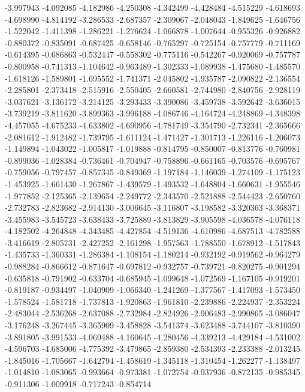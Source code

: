 -3.997943
-4.092085
-4.182986
-4.250308
-4.342499
-4.428484
-4.515229
-4.618693
-4.698990
-4.814192
-3.286533
-2.687357
-2.309067
-2.048043
-1.849625
-1.646756
-1.522042
-1.411398
-1.286221
-1.276624
-1.066878
-1.007644
-0.955326
-0.926882
-0.880372
-0.835091
-0.687425
-0.658146
-0.765297
-0.725154
-0.757779
-0.711169
-0.614395
-0.686863
-0.532447
-0.558302
-0.775116
-0.542267
-0.920069
-0.757787
-0.800958
-0.741313
-1.104642
-0.963489
-1.302333
-1.089938
-1.475680
-1.485570
-1.618126
-1.589801
-1.695552
-1.741371
-2.045802
-1.935787
-2.090822
-2.136554
-2.285801
-2.373418
-2.515916
-2.550405
-2.660581
-2.744980
-2.840756
-2.928119
-3.037621
-3.136172
-3.214125
-3.293433
-3.390086
-3.459738
-3.592642
-3.636015
-3.739219
-3.811620
-3.899363
-3.996188
-4.086746
-4.164724
-4.248869
-4.348398
-4.457055
-4.675233
-4.633802
-4.690956
-4.781749
-3.354790
-2.732341
-2.365666
-2.081612
-1.912482
-1.739795
-1.611124
-1.471427
-1.301713
-1.226116
-1.206073
-1.149894
-1.043022
-1.005817
-1.019888
-0.814795
-0.850007
-0.813776
-0.760981
-0.899036
-1.028384
-0.736461
-0.704947
-0.758896
-0.661165
-0.703576
-0.695767
-0.759056
-0.797457
-0.857345
-0.849369
-1.197184
-1.146039
-1.274109
-1.175123
-1.453925
-1.661430
-1.267867
-1.439579
-1.493532
-1.648804
-1.660631
-1.955546
-1.977852
-2.125365
-2.139654
-2.249772
-2.343570
-2.521888
-2.544423
-2.650760
-2.732783
-2.823682
-2.914130
-3.006645
-3.116807
-3.198582
-3.320363
-3.368371
-3.455983
-3.545723
-3.638433
-3.725889
-3.813829
-3.905598
-4.036578
-4.076118
-4.182502
-4.264848
-4.343485
-4.427854
-4.519136
-4.610986
-4.687513
-4.782588
-3.416619
-2.805731
-2.427252
-2.161298
-1.957563
-1.788550
-1.678912
-1.517843
-1.435733
-1.360331
-1.286384
-1.108154
-1.180214
-0.932192
-0.919562
-0.964279
-0.988284
-0.866612
-0.871647
-0.697812
-0.932757
-0.739721
-0.820275
-0.901294
-0.635818
-0.791902
-0.633704
-0.685945
-1.099648
-1.072569
-1.167105
-0.919201
-0.819187
-0.934497
-1.040909
-1.066340
-1.241269
-1.377567
-1.417093
-1.573450
-1.578524
-1.581718
-1.737813
-1.920863
-1.961810
-2.239886
-2.224937
-2.353224
-2.483044
-2.536268
-2.637088
-2.732984
-2.824926
-2.906483
-2.990865
-3.086047
-3.176248
-3.267445
-3.365909
-3.458828
-3.541374
-3.623488
-3.744107
-3.810390
-3.891805
-3.991533
-4.069488
-4.160645
-4.280456
-4.339213
-4.429184
-4.531002
-4.596703
-4.685006
-4.775392
-3.479865
-2.859380
-2.534393
-2.233388
-2.013245
-1.845016
-1.705667
-1.642794
-1.458619
-1.345118
-1.310454
-1.262277
-1.138497
-1.014810
-1.083065
-0.993664
-0.973381
-1.072754
-0.937936
-0.872135
-0.985345
-0.911306
-1.009918
-0.717243
-0.854714
